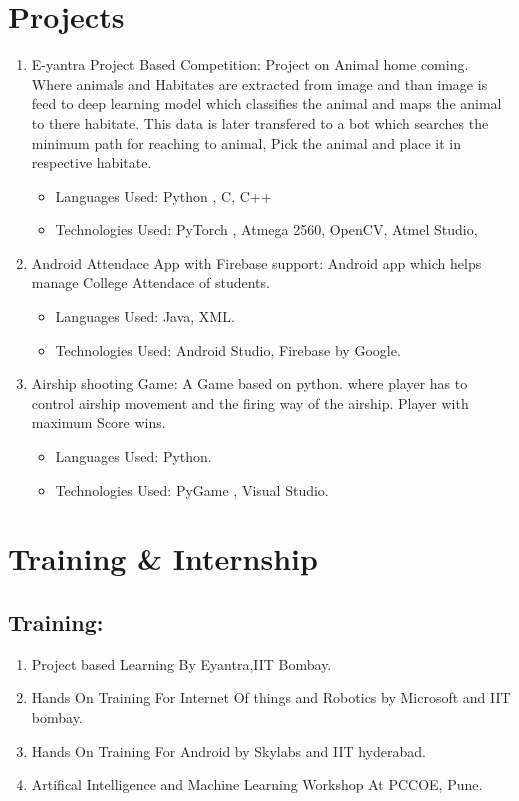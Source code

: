 \documentclass[5pt]{article}
\begin{document}
\section{Projects}
	\begin{enumerate}
		\item E-yantra Project Based Competition: Project on Animal home coming. Where animals and Habitates are extracted from image and than image is feed to deep learning model which classifies the animal and maps the animal to there habitate. This data is later transfered to a bot which searches the minimum path for reaching to animal, Pick the animal and place it in respective habitate.
			\begin{itemize}
			\item Languages Used: Python , C, C++
			\item Technologies Used: PyTorch , Atmega 2560, OpenCV, Atmel Studio, 
			
			\end{itemize}
		\item Android Attendace App with Firebase support: Android app which helps manage College Attendace of students.
			\begin{itemize}
			\item Languages Used: Java, XML.
			\item Technologies Used: Android Studio, Firebase by Google. 
			
			\end{itemize}
		\item Airship shooting Game:  A Game based on python.  where player has to control airship movement and the firing way of the airship. Player with maximum Score wins.
			\begin{itemize}
			\item Languages Used: Python.
			\item Technologies Used: PyGame , Visual Studio. 
			
			\end{itemize}
  
	\end{enumerate}


\section{Training \& Internship}
\subsection{Training:}
\begin{enumerate}
\item Project based Learning By Eyantra,IIT Bombay.
\item Hands On Training For Internet Of things and Robotics by Microsoft and IIT bombay.
\item Hands On Training For Android by Skylabs and IIT hyderabad.
\item Artifical Intelligence and Machine Learning Workshop At PCCOE, Pune. 
\end{enumerate}
\end{document}
